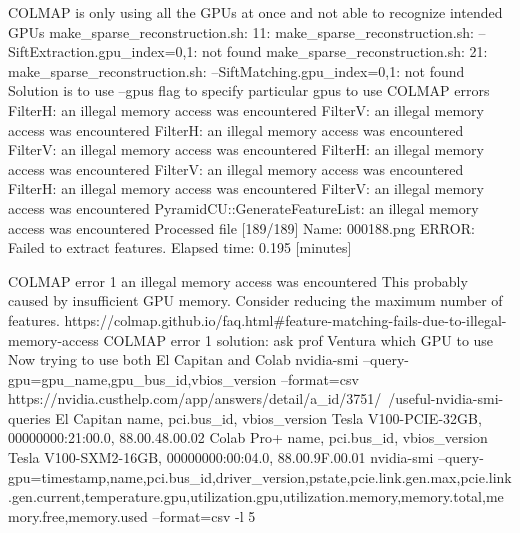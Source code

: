 COLMAP is only using all the GPUs at once and not able to recognize intended GPUs
make_sparse_reconstruction.sh: 11: make_sparse_reconstruction.sh: --SiftExtraction.gpu_index=0,1: not found
make_sparse_reconstruction.sh: 21: make_sparse_reconstruction.sh: --SiftMatching.gpu_index=0,1: not found
Solution is to use --gpus flag to specify particular gpus to use
COLMAP errors
FilterH:        an illegal memory access was encountered
FilterV:        an illegal memory access was encountered
FilterH:        an illegal memory access was encountered
FilterV:        an illegal memory access was encountered
FilterH:        an illegal memory access was encountered
FilterV:        an illegal memory access was encountered
FilterH:        an illegal memory access was encountered
FilterV:        an illegal memory access was encountered
PyramidCU::GenerateFeatureList: an illegal memory access was encountered
Processed file [189/189]
  Name:            000188.png
  ERROR: Failed to extract features.
Elapsed time: 0.195 [minutes]




COLMAP error 1
an illegal memory access was encountered
This probably caused by insufficient GPU
memory. Consider reducing the maximum number of features.
https://colmap.github.io/faq.html#feature-matching-fails-due-to-illegal-memory-access
COLMAP error 1 solution: ask prof Ventura which GPU to use
Now trying to use both El Capitan and Colab
nvidia-smi --query-gpu=gpu_name,gpu_bus_id,vbios_version --format=csv
https://nvidia.custhelp.com/app/answers/detail/a_id/3751/~/useful-nvidia-smi-queries 
El Capitan 
name, pci.bus_id, vbios_version
Tesla V100-PCIE-32GB, 00000000:21:00.0, 88.00.48.00.02
Colab Pro+
name, pci.bus_id, vbios_version
Tesla V100-SXM2-16GB, 00000000:00:04.0, 88.00.9F.00.01
nvidia-smi --query-gpu=timestamp,name,pci.bus_id,driver_version,pstate,pcie.link.gen.max,pcie.link.gen.current,temperature.gpu,utilization.gpu,utilization.memory,memory.total,memory.free,memory.used --format=csv -l 5





